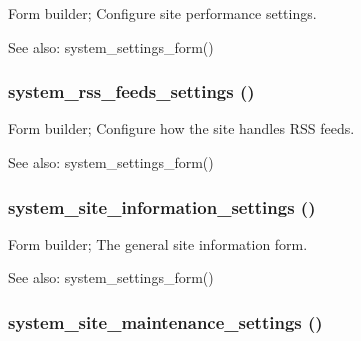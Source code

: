 Form builder; Configure site performance settings.

\begin{Desc}
\item[See also:]system\_\-settings\_\-form() \end{Desc}
\hypertarget{group__forms_gcff83234fa52dbaaf85c122bd300a374}{
\subsubsection[{system\_\-rss\_\-feeds\_\-settings}]{\setlength{\rightskip}{0pt plus 5cm}system\_\-rss\_\-feeds\_\-settings ()}}
\label{group__forms_gcff83234fa52dbaaf85c122bd300a374}


Form builder; Configure how the site handles RSS feeds.

\begin{Desc}
\item[See also:]system\_\-settings\_\-form() \end{Desc}
\hypertarget{group__forms_g80e6b3130e47d51243151f1aa04742a3}{
\subsubsection[{system\_\-site\_\-information\_\-settings}]{\setlength{\rightskip}{0pt plus 5cm}system\_\-site\_\-information\_\-settings ()}}
\label{group__forms_g80e6b3130e47d51243151f1aa04742a3}


Form builder; The general site information form.

\begin{Desc}
\item[See also:]system\_\-settings\_\-form() \end{Desc}
\hypertarget{group__forms_g1f5acd366b9bb206d73876d3686d7fce}{
\subsubsection[{system\_\-site\_\-maintenance\_\-settings}]{\setlength{\rightskip}{0pt plus 5cm}system\_\-site\_\-maintenance\_\-settings ()}}
\label{group__forms_g1f5acd366b9bb206d73876d3686d7fce}


